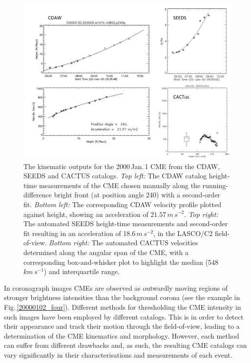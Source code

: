 \documentclass[referee,a4paper,12pt,traditabstract]{swsc}
\begin{document}
\begin{linenumbers}
\begin{figure}[!h]
\centerline{\includegraphics[scale=0.68, trim=20 0 0 0, clip=true]{images/20000102_kins_plots.pdf}}
\caption{The kinematic outputs for the 2000\,Jan.\,1 CME from the CDAW, SEEDS and CACTUS catalogs. \emph{Top left:} The CDAW catalog height-time measurements of the CME chosen manually along the running-difference bright front (at position angle 240) with a second-order fit. \emph{Bottom left:} The corresponding CDAW velocity profile plotted against height, showing an acceleration of $21.57\,m\,s^{-2}$. \emph{Top right:} The automated SEEDS height-time measurements and second-order fit resulting in an acceleration of 18.6\,$m\,s^{-2}$, in the LASCO/C2 field-of-view. \emph{Bottom right:} The automated CACTUS velocities determined along the angular span of the CME, with a corresponding box-and-whisker plot to highlight the median (548\,$km\,s^{-1}$) and interquartile range.}
\label{20000102_kins_plots}
\end{figure}

In coronagraph images CMEs are observed as outwardly moving regions of stronger brightness intensities than the background corona (see the example in Fig.\,\ref{20000102_four}). Different methods for thresholding the CME intensity in such images have been employed by different catalogs. This is in order to detect their appearance and track their motion through the field-of-view, leading to a determination of the CME kinematics and morphology. However, each method can suffer from different drawbacks and, as such, the resulting CME catalogs can vary significantly in their characterisations and measurements of each event. 



\end{linenumbers}
\end{document}
